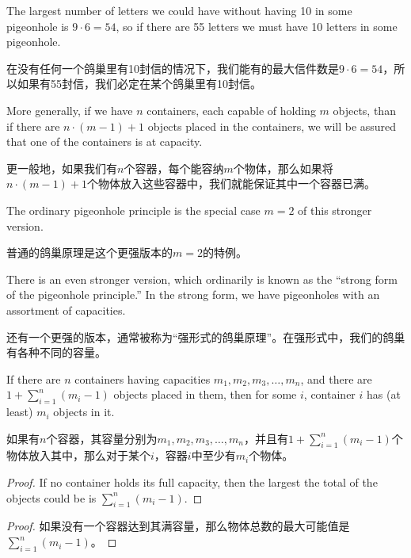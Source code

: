 The largest number of letters
we could have without having 10 in some pigeonhole is $9 \cdot 6 = 54$, so if
there are 55 letters we must have 10 letters in some pigeonhole.

在没有任何一个鸽巢里有10封信的情况下，我们能有的最大信件数是$9 \cdot 6 = 54$，所以如果有55封信，我们必定在某个鸽巢里有10封信。

More generally, if we have $n$ containers, each capable of holding $m$
objects, than if there are $n \cdot (m-1) + 1$ objects placed in the 
containers, we will be assured that one of the containers is at capacity.

更一般地，如果我们有$n$个容器，每个能容纳$m$个物体，那么如果将$n \cdot (m-1) + 1$个物体放入这些容器中，我们就能保证其中一个容器已满。

The ordinary pigeonhole principle is the special case $m=2$ of this 
stronger version.

普通的鸽巢原理是这个更强版本的$m=2$的特例。

There is an even stronger version, which ordinarily is known as the 
 ``strong form of the pigeonhole
principle.''  In the strong form, we have pigeonholes with an assortment
of capacities.

还有一个更强的版本，通常被称为“强形式的鸽巢原理”。在强形式中，我们的鸽巢有各种不同的容量。

\begin{thm}
If there are $n$ containers having capacities $m_1, m_2, m_3, \ldots, m_n$,
and there are $1 + \sum_{i=1}^n (m_i - 1)$ objects placed in them, then for
some $i$, container $i$ has (at least) $m_i$ objects in it.
\end{thm} 

\begin{thm}
如果有$n$个容器，其容量分别为$m_1, m_2, m_3, \ldots, m_n$，并且有$1 + \sum_{i=1}^n (m_i - 1)$个物体放入其中，那么对于某个$i$，容器$i$中至少有$m_i$个物体。
\end{thm}

\begin{proof}
If no container holds its full capacity, then the largest the
total of the objects could be is $\sum_{i=1}^n (m_i - 1)$.
\end{proof}

\begin{proof}
如果没有一个容器达到其满容量，那么物体总数的最大可能值是$\sum_{i=1}^n (m_i - 1)$。
\end{proof}


